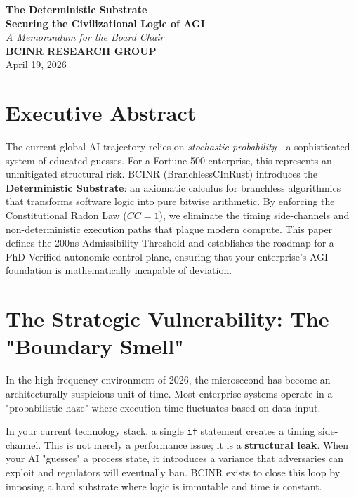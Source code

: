 \documentclass[11pt,a4paper]{article}
\begin{document}
\begin{titlepage}
    \begin{center}
        \vspace*{2cm}
        {\Huge \textbf{The Deterministic Substrate}} \\
        \vspace{0.5cm}
        {\Large \textbf{Securing the Civilizational Logic of AGI}} \\
        \vspace{1.5cm}
        {\large \textit{A Memorandum for the Board Chair}} \\
        \vspace{2cm}
        \textbf{BCINR RESEARCH GROUP} \\
        \vspace{1cm}
        April 19, 2026
    \end{center}
    
    \vspace{4cm}
    
    \section*{Executive Abstract}
    The current global AI trajectory relies on \textit{stochastic probability}---a sophisticated system of educated guesses. For a Fortune 500 enterprise, this represents an unmitigated structural risk. BCINR (BranchlessCInRust) introduces the \textbf{Deterministic Substrate}: an axiomatic calculus for branchless algorithmics that transforms software logic into pure bitwise arithmetic. By enforcing the Constitutional Radon Law ($CC=1$), we eliminate the timing side-channels and non-deterministic execution paths that plague modern compute. This paper defines the 200ns Admissibility Threshold and establishes the roadmap for a PhD-Verified autonomic control plane, ensuring that your enterprise's AGI foundation is mathematically incapable of deviation.
\end{titlepage}

\section{The Strategic Vulnerability: The "Boundary Smell"}
In the high-frequency environment of 2026, the microsecond has become an architecturally suspicious unit of time. Most enterprise systems operate in a "probabilistic haze" where execution time fluctuates based on data input. 

In your current technology stack, a single \texttt{if} statement creates a timing side-channel. This is not merely a performance issue; it is a \textbf{structural leak}. When your AI "guesses" a process state, it introduces a variance that adversaries can exploit and regulators will eventually ban. BCINR exists to close this loop by imposing a hard substrate where logic is immutable and time is constant.
\end{document}
